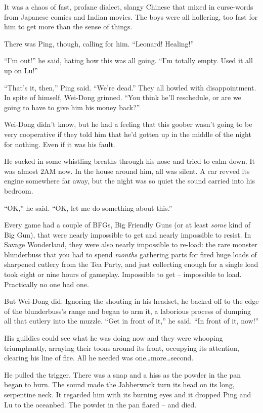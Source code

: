 It was a chaos of fast, profane dialect, slangy Chinese that mixed
in curse-words from Japanese comics and Indian movies. The boys
were all hollering, too fast for him to get more than the sense of
things.

There was Ping, though, calling for him. ``Leonard! Healing!''

``I'm out!'' he said, hating how this was all going. ``I'm totally
empty. Used it all up on Lu!''

``That's it, then,'' Ping said. ``We're dead.'' They all howled with
disappointment. In spite of himself, Wei-Dong grinned. ``You think
he'll reschedule, or are we going to have to give him his money
back?''

Wei-Dong didn't know, but he had a feeling that this goober wasn't
going to be very cooperative if they told him that he'd gotten up
in the middle of the night for nothing. Even if it was his fault.

He sucked in some whistling breaths through his nose and tried to
calm down. It was almost 2AM now. In the house around him, all was
silent. A car revved its engine somewhere far away, but the night
was so quiet the sound carried into his bedroom.

``OK,'' he said. ``OK, let me do something about this.''

Every game had a couple of BFGs, Big Friendly Guns (or at least
\emph{some} kind of Big Gun), that were nearly impossible to get
and nearly impossible to resist. In Savage Wonderland, they were
also nearly impossible to re-load: the rare monster blunderbuss
that you had to spend \emph{months} gathering parts for fired huge
loads of sharpened cutlery from the Tea Party, and just collecting
enough for a single load took eight or nine hours of gameplay.
Impossible to get -- impossible to load. Practically no one had
one.

But Wei-Dong did. Ignoring the shouting in his headset, he backed
off to the edge of the blunderbuss's range and began to arm it, a
laborious process of dumping all that cutlery into the muzzle. ``Get
in front of it,'' he said. ``In front of it, now!''

His guildies could see what he was doing now and they were whooping
triumphantly, arraying their toons around its front, occupying its
attention, clearing his line of fire. All he needed was
one\ldots{}more\ldots{}second.

He pulled the trigger. There was a snap and a hiss as the powder in
the pan began to burn. The sound made the Jabberwock turn its head
on its long, serpentine neck. It regarded him with its burning eyes
and it dropped Ping and Lu to the oceanbed. The powder in the pan
flared -- and died.

